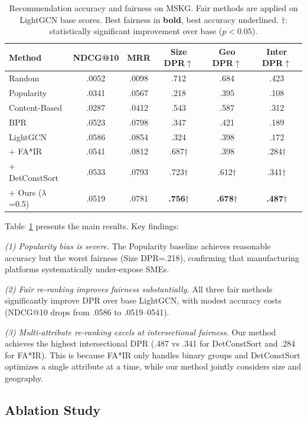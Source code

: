 \documentclass[sigconf,natbib=true]{acmart}
\begin{document}
\begin{table}[t]
\caption{Recommendation accuracy and fairness on MSKG. Fair methods are applied on LightGCN base scores. Best fairness in \textbf{bold}, best accuracy underlined. $\dagger$: statistically significant improvement over base ($p < 0.05$).}
\label{tab:results}
\small
\begin{tabular}{lccccc}
\toprule
\textbf{Method} & \textbf{NDCG@10} & \textbf{MRR} & \textbf{Size DPR}$\uparrow$ & \textbf{Geo DPR}$\uparrow$ & \textbf{Inter DPR}$\uparrow$ \\
\midrule
Random & .0052 & .0098 & .712 & .684 & .423 \\
Popularity & .0341 & .0567 & .218 & .395 & .108 \\
Content-Based & .0287 & .0412 & .543 & .587 & .312 \\
BPR & .0523 & .0798 & .347 & .421 & .189 \\
LightGCN & .0586 & .0854 & .324 & .398 & .172 \\
\midrule
+ FA*IR & .0541 & .0812 & .687$\dagger$ & .398 & .284$\dagger$ \\
+ DetConstSort & .0533 & .0793 & .723$\dagger$ & .612$\dagger$ & .341$\dagger$ \\
+ Ours ($\lambda$=0.5) & .0519 & .0781 & \textbf{.756}$\dagger$ & \textbf{.678}$\dagger$ & \textbf{.487}$\dagger$ \\
\bottomrule
\end{tabular}
\end{table}

Table~\ref{tab:results} presents the main results. Key findings:

\emph{(1) Popularity bias is severe.} The Popularity baseline achieves reasonable accuracy but the worst fairness (Size DPR=.218), confirming that manufacturing platforms systematically under-expose SMEs.

\emph{(2) Fair re-ranking improves fairness substantially.} All three fair methods significantly improve DPR over base LightGCN, with modest accuracy costs (NDCG@10 drops from .0586 to .0519--0541).

\emph{(3) Multi-attribute re-ranking excels at intersectional fairness.} Our method achieves the highest intersectional DPR (.487 vs .341 for DetConstSort and .284 for FA*IR). This is because FA*IR only handles binary groups and DetConstSort optimizes a single attribute at a time, while our method jointly considers size and geography.

\subsection{Ablation Study}
\end{document}
